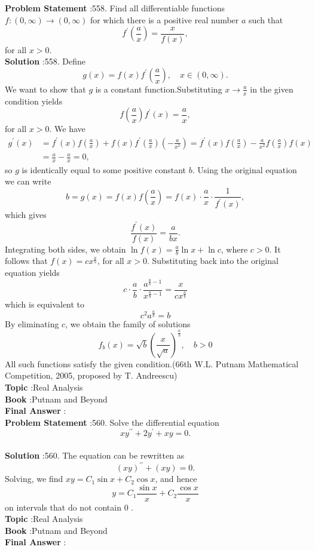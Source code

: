 \documentclass[10pt]{article}
\begin{document}
\textbf{Problem Statement} :558. Find all differentiable functions $f:(0, \infty) \rightarrow(0, \infty)$ for which there is a positive real number $a$ such that$$ f^{\prime}\left(\frac{a}{x}\right)=\frac{x}{f(x)}, $$for all $x>0$.\\
\textbf{Solution} :558. Define$$ g(x)=f(x) f^{\prime}\left(\frac{a}{x}\right), \quad x \in(0, \infty) . $$We want to show that $g$ is a constant function.Substituting $x \rightarrow \frac{a}{x}$ in the given condition yields$$ f\left(\frac{a}{x}\right) f^{\prime}(x)=\frac{a}{x}, $$for all $x>0$. We have$$ \begin{aligned} g^{\prime}(x) &=f^{\prime}(x) f\left(\frac{a}{x}\right)+f(x) f^{\prime}\left(\frac{a}{x}\right)\left(-\frac{a}{x^{2}}\right)=f^{\prime}(x) f\left(\frac{a}{x}\right)-\frac{a}{x^{2}} f\left(\frac{a}{x}\right) f(x) \\ &=\frac{a}{x}-\frac{a}{x}=0, \end{aligned} $$so $g$ is identically equal to some positive constant $b$. Using the original equation we can write$$ b=g(x)=f(x) f\left(\frac{a}{x}\right)=f(x) \cdot \frac{a}{x} \cdot \frac{1}{f^{\prime}(x)}, $$which gives$$ \frac{f^{\prime}(x)}{f(x)}=\frac{a}{b x} . $$Integrating both sides, we obtain $\ln f(x)=\frac{a}{b} \ln x+\ln c$, where $c>0$. It follows that $f(x)=c x^{\frac{a}{b}}$, for all $x>0$. Substituting back into the original equation yields $$ c \cdot \frac{a}{b} \cdot \frac{a^{\frac{a}{b}-1}}{x^{\frac{a}{b}-1}}=\frac{x}{c x^{\frac{a}{b}}} $$which is equivalent to$$ c^{2} a^{\frac{a}{b}}=b $$By eliminating $c$, we obtain the family of solutions$$ f_{b}(x)=\sqrt{b}\left(\frac{x}{\sqrt{a}}\right)^{\frac{a}{b}}, \quad b>0 $$All such functions satisfy the given condition.(66th W.L. Putnam Mathematical Competition, 2005, proposed by T. Andreescu)\\
\textbf{Topic} :Real Analysis\\
\textbf{Book} :Putnam and Beyond\\
\textbf{Final Answer} :\\


\textbf{Problem Statement} :560. Solve the differential equation$$ x y^{\prime \prime}+2 y^{\prime}+x y=0 . $$\\
\textbf{Solution} :560. The equation can be rewritten as$$ (x y)^{\prime \prime}+(x y)=0 . $$Solving, we find $x y=C_{1} \sin x+C_{2} \cos x$, and hence$$ y=C_{1} \frac{\sin x}{x}+C_{2} \frac{\cos x}{x} $$on intervals that do not contain 0 .\\
\textbf{Topic} :Real Analysis\\
\textbf{Book} :Putnam and Beyond\\
\textbf{Final Answer} :\\
\end{document}
